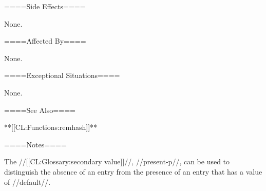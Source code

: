 ====Side Effects====

None.

====Affected By====

None.

====Exceptional Situations====

None.

====See Also====

**[[CL:Functions:remhash]]**

====Notes====

The //[[CL:Glossary:secondary value]]//, //present-p//, can be used to distinguish the absence of an entry from the presence of an entry that has a value of //default//.

